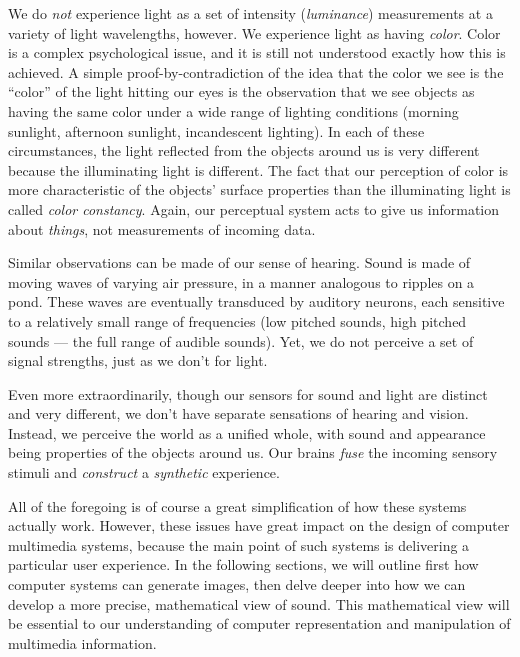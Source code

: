 We do \emph{not} experience light as a set of intensity
(\emph{luminance}) measurements at a variety of light wavelengths,
however.  We experience light as having \emph{color}. Color is a
complex psychological issue, and it is still not understood exactly
how this is achieved. A simple proof-by-contradiction of the idea that
the color we see is the ``color'' of the light hitting our eyes is the
observation that we see objects as having the same color under a wide
range of lighting conditions (morning sunlight, afternoon sunlight,
incandescent lighting). In each of these circumstances, the light
reflected from the objects around us is very different because the
illuminating light is different.  The fact that our perception of
color is more characteristic of the objects' surface properties than
the illuminating light is called \emph{color constancy}. Again, our
perceptual system acts to give us information about \emph{things}, not
measurements of incoming data.

Similar observations can be made of our sense of hearing. Sound is
made of moving waves of varying air pressure, in a manner analogous to
ripples on a pond. These waves are eventually transduced by auditory
neurons, each sensitive to a relatively small range of frequencies
(low pitched sounds, high pitched sounds --- the full range of audible
sounds).  Yet, we do not perceive a set of signal strengths, just as
we don't for light.

Even more extraordinarily, though our sensors for sound and light are
distinct and very different, we don't have separate sensations of
hearing and vision.  Instead, we perceive the world as a unified
whole, with sound and appearance being properties of the objects
around us. Our brains \emph{fuse} the incoming sensory stimuli and
\emph{construct} a \emph{synthetic} experience.

All of the foregoing is of course a great simplification of how these
systems actually work.  However, these issues have great impact on the
design of computer multimedia systems, because the main point of such
systems is delivering a particular user experience. In the following
sections, we will outline first how computer systems can generate
images, then delve deeper into how we can develop a more precise,
mathematical view of sound. This mathematical view will be essential
to our understanding of computer representation and manipulation of
multimedia information.

